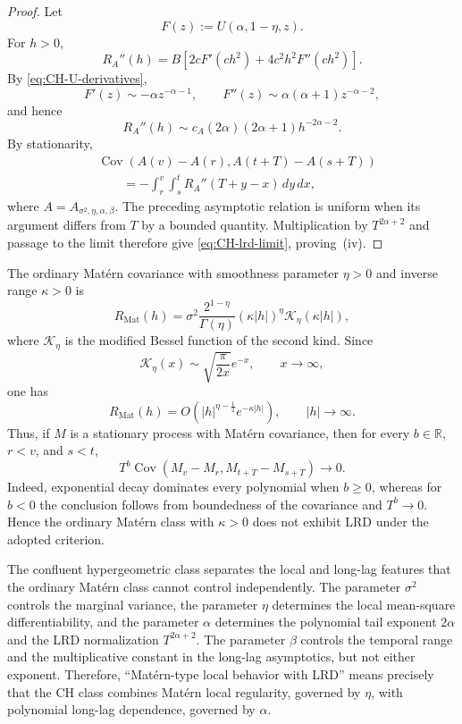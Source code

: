 \documentclass[preprint,12pt,authoryear]{elsarticle}
\begin{document}
\begin{proof}
Let
\[
F(z):=U(\alpha,1-\eta,z).
\]
For \(h>0\),
\[
R_A''(h)
=
B\left[
2cF'(ch^2)+4c^2h^2F''(ch^2)
\right].
\]
By \eqref{eq:CH-U-derivatives},
\[
F'(z)\sim-\alpha z^{-\alpha-1},
\qquad
F''(z)\sim\alpha(\alpha+1)z^{-\alpha-2},
\]
and hence
\[
R_A''(h)
\sim
c_A(2\alpha)(2\alpha+1)h^{-2\alpha-2}.
\]
By stationarity,
\[
\begin{aligned}
&\operatorname{Cov}
\left(
A(v)-A(r),
A(t+T)-A(s+T)
\right)
\\
&\qquad
=
-\int_r^v\int_s^t
R_A''(T+y-x)\,dy\,dx,
\end{aligned}
\]
where \(A=A_{\sigma^2,\eta,\alpha,\beta}\). The preceding asymptotic
relation is uniform when its argument differs from \(T\) by a bounded
quantity. Multiplication by \(T^{2\alpha+2}\) and passage to the limit
therefore give \eqref{eq:CH-lrd-limit}, proving~(iv).
\end{proof}

\begin{rem}
\label{rem:CH-Matern-LRD}
The ordinary Matérn covariance with smoothness parameter \(\eta>0\) and
inverse range \(\kappa>0\) is
\[
R_{\mathrm{Mat}}(h)
=
\sigma^2
\frac{2^{1-\eta}}{\Gamma(\eta)}
(\kappa|h|)^\eta
\mathcal{K}_{\eta}(\kappa|h|),
\]
where \(\mathcal{K}_{\eta}\) is the modified Bessel function of the
second kind. Since
\[
\mathcal{K}_{\eta}(x)
\sim
\sqrt{\frac{\pi}{2x}}e^{-x},
\qquad x\to\infty,
\]
one has
\[
R_{\mathrm{Mat}}(h)
=
O\!\left(
|h|^{\eta-\frac12}e^{-\kappa|h|}
\right),
\qquad |h|\to\infty .
\]
Thus, if \(M\) is a stationary process with Matérn covariance, then for
every \(b\in\mathbb R\), \(r<v\), and \(s<t\),
\[
T^b
\operatorname{Cov}
\left(
M_v-M_r,
M_{t+T}-M_{s+T}
\right)
\longrightarrow0.
\]
Indeed, exponential decay dominates every polynomial when \(b\geq0\),
whereas for \(b<0\) the conclusion follows from boundedness of the
covariance and \(T^b\to0\). Hence the ordinary Matérn class with
\(\kappa>0\) does not exhibit LRD under the adopted criterion.

The confluent hypergeometric class separates the local and long-lag
features that the ordinary Matérn class cannot control independently.
The parameter \(\sigma^2\) controls the marginal variance, the parameter
\(\eta\) determines the local mean-square differentiability, and the
parameter \(\alpha\) determines the polynomial tail exponent \(2\alpha\)
and the LRD normalization \(T^{2\alpha+2}\). The parameter \(\beta\)
controls the temporal range and the multiplicative constant in the
long-lag asymptotics, but not either exponent. Therefore,
``Matérn-type local behavior with LRD'' means precisely that the CH class
combines Matérn local regularity, governed by \(\eta\), with polynomial
long-lag dependence, governed by \(\alpha\).
\end{rem}
\end{document}
